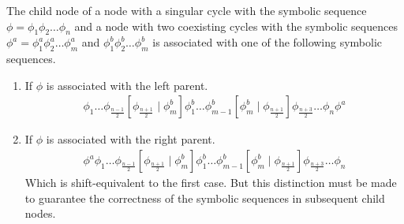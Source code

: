 \begin{theorem}
	The child node of a node with a singular cycle with the symbolic sequence $\phi = \phi_1\phi_2 \dots \phi_n$ and a node with two coexisting cycles with the symbolic sequences $\phi^a = \phi^a_1\phi^a_2 \dots \phi^a_m$ and $\phi^b_1\phi^b_2 \dots \phi^b_m$ is associated with one of the following symbolic sequences.
	\begin{enumerate}
		\item If $\phi$ is associated with the left parent.
		      \begin{align}
			      \phi_1 \dots \phi_{\frac{n-1}{2}} \left[\phi_{\frac{n+1}{2}} \mid \phi^b_m\right]
			      \phi^b_1 \dots \phi^b_{m-1} \left[\phi^b_m \mid \phi_{\frac{n+1}{2}}\right]
			      \phi_{\frac{n+3}{2}} \dots \phi_n \phi^a
		      \end{align}
		\item If $\phi$ is associated with the right parent.
		      \begin{align}
			      \phi^a \phi_1 \dots \phi_{\frac{n-1}{2}} \left[\phi_{\frac{n+1}{2}} \mid \phi^b_m\right]
			      \phi^b_1 \dots \phi^b_{m-1} \left[\phi^b_m \mid \phi_{\frac{n+1}{2}}\right]
			      \phi_{\frac{n+3}{2}} \dots \phi_n
		      \end{align}
		      Which is shift-equivalent to the first case.
		      But this distinction must be made to guarantee the correctness of the symbolic sequences in subsequent child nodes.
	\end{enumerate}
\end{theorem}

